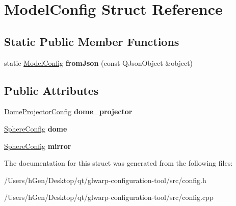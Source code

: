 \hypertarget{struct_model_config}{}\section{Model\+Config Struct Reference}
\label{struct_model_config}
\subsection*{Static Public Member Functions}
\begin{DoxyCompactItemize}
\item 
\mbox{\label{struct_model_config_a91b93e14eb8340c9ddc69803086fdaa9}} 
static \mbox{\hyperlink{struct_model_config}{Model\+Config}} {\bfseries from\+Json} (const Q\+Json\+Object \&object)
\end{DoxyCompactItemize}
\subsection*{Public Attributes}
\begin{DoxyCompactItemize}
\item 
\mbox{\label{struct_model_config_a3ccee2fc963e2e10d120d52c67b3078e}} 
\mbox{\hyperlink{struct_dome_projector_config}{Dome\+Projector\+Config}} {\bfseries dome\+\_\+projector}
\item 
\mbox{\label{struct_model_config_a48f3bfe8ddf6e9bdb753b298e90800a7}} 
\mbox{\hyperlink{struct_sphere_config}{Sphere\+Config}} {\bfseries dome}
\item 
\mbox{\label{struct_model_config_a5b1cd485659bfe6009bbdba15e362e7c}} 
\mbox{\hyperlink{struct_sphere_config}{Sphere\+Config}} {\bfseries mirror}
\end{DoxyCompactItemize}


The documentation for this struct was generated from the following files\+:\begin{DoxyCompactItemize}
\item 
/\+Users/h\+Gen/\+Desktop/qt/glwarp-\/configuration-\/tool/src/config.\+h\item 
/\+Users/h\+Gen/\+Desktop/qt/glwarp-\/configuration-\/tool/src/config.\+cpp\end{DoxyCompactItemize}
